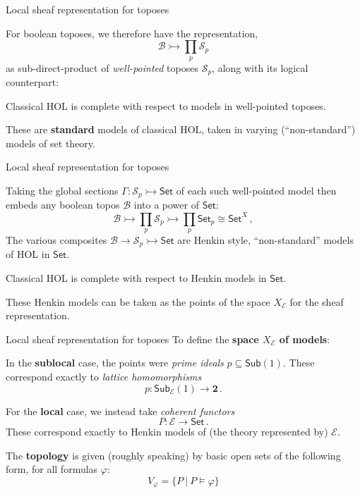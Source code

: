 \documentclass{beamer}
\newcommand{\E}{\ensuremath{\mathcal{E}}}
\newcommand{\myemph}[1]{\textbf{#1}}    %
\newcommand{\Set}{\mathsf{Set}}
\begin{document}
\begin{frame}{Local sheaf representation for toposes}

For boolean toposes, we therefore have the  representation, 
\[
\mathcal{B} \rightarrowtail \prod_{p}\mathcal{S}_p 
\]
as sub-direct-product of \emph{well-pointed} toposes $\mathcal{S}_p$, along with its logical counterpart:
%
\begin{corollary}
Classical HOL is complete with respect to models in well-pointed toposes.
\end{corollary}
\medskip

These are \myemph{standard} models of classical HOL, taken in varying (``non-standard'') models of set theory.

\end{frame}
\begin{frame}{Local sheaf representation for toposes}


Taking the global sections $\Gamma:\mathcal{S}_p \rightarrowtail \Set$ of each such well-pointed model then embeds any boolean topos $\mathcal{B}$ into a power of $\Set$:
\[
\mathcal{B} \rightarrowtail \prod_{p}\mathcal{S}_p \rightarrowtail \prod_{p}\Set_p \cong \Set^X\,,
\]
The various composites $\mathcal{B} \rightarrow \mathcal{S}_p \rightarrowtail \Set$ are Henkin style, ``non-standard'' models of HOL in $\Set$.

\begin{corollary}
Classical HOL is complete with respect to Henkin models in $\Set$.
\end{corollary}
\medskip

These Henkin models can be taken as the points of the space $X_\E$ for the sheaf representation.

\end{frame}
\begin{frame}{Local sheaf representation for toposes}
To define the \myemph{space $X_\E$ of models}:
\medskip

In the \myemph{sublocal} case, the points were \emph{prime ideals} $p\subseteq\mathsf{Sub}(1)$.
These correspond exactly to \emph{lattice homomorphisms} $$p: \mathsf{Sub}_{\E}(1)\to \mathbf{2}\,.$$

For the \myemph{local} case, we instead take \emph{coherent functors} $$P: \E\to\Set\,.$$
These correspond exactly to Henkin models of (the theory represented by) $\E$.
\medskip

The \myemph{topology} is given (roughly speaking) by basic open sets of the following form, for all formulas $\varphi$:
\[
V_\varphi = \{ P\ |\ P\models \varphi \}
\]

\end{frame}
\end{document}
